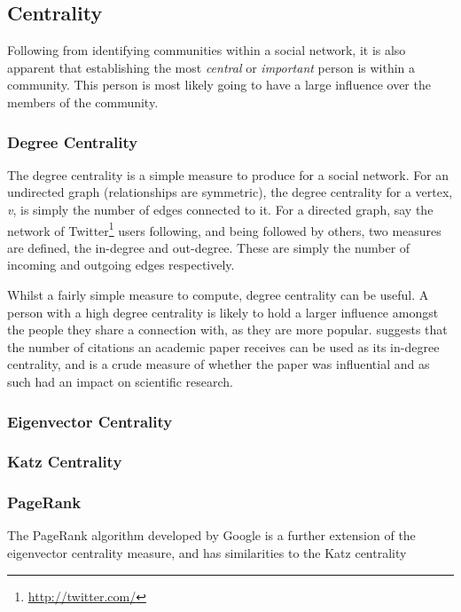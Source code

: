 \subsection{Centrality}
Following from identifying communities within a social network, it is also apparent that establishing the most \emph{central} or \emph{important} person is within a community. This person is most likely going to have a large influence over the members of the community.

\subsubsection{Degree Centrality}
The degree centrality is a simple measure to produce for a social network. For an undirected graph (relationships are symmetric), the degree centrality for a vertex, \emph{v}, is simply the number of edges connected to it. For a directed graph, say the network of Twitter\footnote{\url{http://twitter.com/}} users following, and being followed by others, two measures are defined, the in-degree and out-degree. These are simply the number of incoming and outgoing edges respectively.

Whilst a fairly simple measure to compute, degree centrality can be useful. A person with a high degree centrality is likely to hold a larger influence amongst the people they share a connection with, as they are more popular. \cite[p.~169]{newman10} suggests that the number of citations an academic paper receives can be used as its in-degree centrality, and is a crude measure of whether the paper was influential and as such had an impact on scientific research.

\subsubsection{Eigenvector Centrality}

\subsubsection{Katz Centrality}
\cite{katz53}

\subsubsection{PageRank}
The PageRank algorithm \cite{pagerank} developed by Google is a further extension of the eigenvector centrality measure, and has similarities to the Katz centrality 

